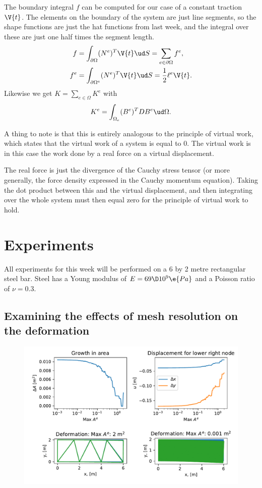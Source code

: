 \documentclass[sigconf]{acmart}
\begin{document}
The boundary integral $ f $ can be computed for our case of a constant traction $ \V{t} $. The elements on the boundary of the system are just line segments, so the shape functions are just the hat functions from last week, and the integral over these are just one half times the segment length.
\begin{align*}
	f &= \int_{\partial\Omega} (N^e)^T \V{t} \ud S = \sum_{e \in \partial \Omega} f^e, \\
	f^e &= \int_{\partial \Omega^e} (N^e)^T \V{t} \ud S = \frac{1}{2} \ell^e \V{t}.
\end{align*}
Likewise we get $ K = \sum_{e\in \Omega}K^e $ with 
\begin{equation*}
	K^e = \int_{\Omega_e}(B^e)^T D B^e \ud \Omega.
\end{equation*}

A thing to note is that this is entirely analogous to the principle of virtual work, which states that the virtual work of a system is equal to 0. The virtual work is in this case the work done by a real force on a virtual displacement.

The real force is just the divergence of the Cauchy stress tensor (or more generally, the force density expressed in the Cauchy momentum equation). Taking the dot product between this and the virtual displacement, and then integrating over the whole system must then equal zero for the principle of virtual work to hold.


\section{Experiments}
All experiments for this week will be performed on a 6 by 2 metre rectangular steel bar. Steel has a Young modulus of $ E = 69\D 10^9 \e{Pa} $ and a Poisson ratio of $ \nu = 0.3 $. 

\subsection{Examining the effects of mesh resolution on the deformation}
\begin{figure}
	\centering
	\includegraphics[width=\linewidth]{ex_resolution.pdf}
\end{figure}
\end{document}
